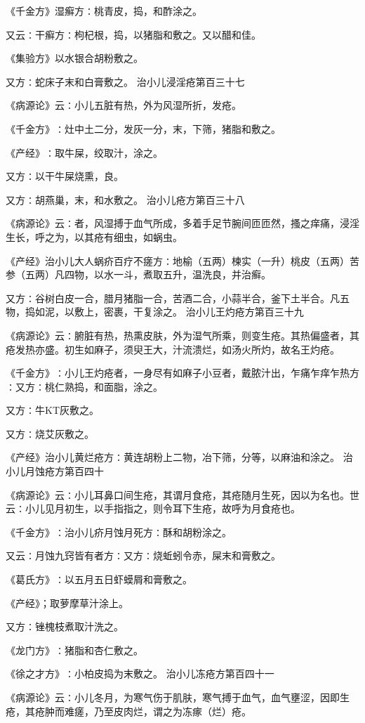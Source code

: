 \documentclass[a4paper,12pt,UTF8,twoside]{ctexbook}
\begin{document}
《千金方》湿癣方∶桃青皮，捣，和酢涂之。

又云∶干癣方∶枸杞根，捣，以猪脂和敷之。又以醋和佳。

《集验方》以水银合胡粉敷之。

又方∶蛇床子末和白膏敷之。
治小儿浸淫疮第百三十七

《病源论》云∶小儿五脏有热，外为风湿所折，发疮。

《千金方》∶灶中土二分，发灰一分，末，下筛，猪脂和敷之。

《产经》∶取牛屎，绞取汁，涂之。

又方∶以干牛屎烧熏，良。

又方∶胡燕巢，末，和水敷之。
治小儿疮方第百三十八

《病源论》云∶者，风湿搏于血气所成，多着手足节腕间匝匝然，搔之痒痛，浸淫生长，呼之为，以其疮有细虫，如蜗虫。

《产经》治小儿大人蜗疥百疗不瘥方∶地榆（五两）楝实（一升）桃皮（五两）苦参（五两）凡四物，以水一斗，煮取五升，温洗良，并治癣。

又方∶谷树白皮一合，腊月猪脂一合，苦酒二合，小蒜半合，釜下土半合。凡五物，捣如泥，以敷上，密裹，干复涂之。
治小儿王灼疮方第百三十九

《病源论》云∶腑脏有热，热熏皮肤，外为湿气所乘，则变生疮。其热偏盛者，其疮发热亦盛。初生如麻子，须臾王大，汁流溃烂，如汤火所灼，故名王灼疮。

《千金方》∶小儿王灼疮者，一身尽有如麻子小豆者，戴脓汁出，乍痛乍痒乍热方∶又方∶桃仁熟捣，和面脂，涂之。

又方∶牛KT灰敷之。

又方∶烧艾灰敷之。

《产经》治小儿黄烂疮方∶黄连胡粉上二物，冶下筛，分等，以麻油和涂之。
治小儿月蚀疮方第百四十

《病源论》云∶小儿耳鼻口间生疮，其谓月食疮，其疮随月生死，因以为名也。世云∶小儿见月初生，以手指指之，则令耳下生疮，故呼为月食疮也。

《千金方》∶治小儿疥月蚀月死方∶酥和胡粉涂之。

又云∶月蚀九窍皆有者方∶又方∶烧蚯蚓令赤，屎末和膏敷之。

《葛氏方》∶以五月五日虾蟆屑和膏敷之。

《产经》；取萝摩草汁涂上。

又方∶锉槐枝煮取汁洗之。

《龙门方》∶猪脂和杏仁敷之。

《徐之才方》∶小柏皮捣为末敷之。
治小儿冻疮方第百四十一

《病源论》云∶小儿冬月，为寒气伤于肌肤，寒气搏于血气，血气壅涩，因即生疮，其疮肿而难瘥，乃至皮肉烂，谓之为冻瘃（烂）疮。
\end{document}
